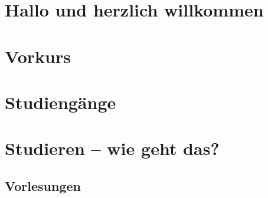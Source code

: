 \documentclass[ngerman,a4paper,openany,showtrims]{memoir}
\begin{document}
\pagestyle{empty}

\frontmatter

\tableofcontents

\mainmatter
\pagestyle{plain}

\chapter{Hallo und herzlich willkommen}


\chapter{Vorkurs}





\chapter{Studiengänge}









\chapter{Studieren -- wie geht das?}

\section{Vorlesungen}











\end{document}
